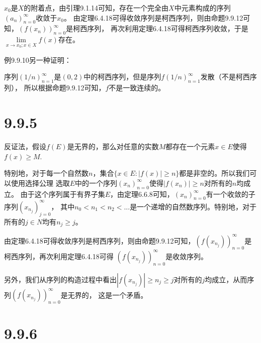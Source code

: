\documentclass{article}
\begin{document}
$x_0$是$X$的附着点，由引理9.1.14可知，存在一个完全由$X$中元素构成的序列$(a_n)_{n=0}^\infty$收敛于$x_0$。
由定理6.4.18可得收敛序列是柯西序列，则由命题9.9.12可知，$(f(x_n))_{n=0}^\infty$是柯西序列，
再次利用定理6.4.18可得柯西序列收敛，于是
$\lim\limits_{x \to x_0; x \in X} f(x)$存在。

例9.9.10另一种证明：

序列$(1/n)_{n=1}^\infty$是$(0,2)$中的柯西序列，但是序列$f(1/n)_{n=1}^\infty$发散（不是柯西序列），
所以根据命题9.9.12可知，$f$不是一致连续的。

\section*{9.9.5}

反证法，假设$f(E)$是无界的，那么对任意的实数$M$都存在一个元素$x \in E$使得$f(x) \geq M$.

特别地，对于每一个自然数$n$，集合$\{x \in E: |f(x)| \geq n\}$都是非空的。所以我们可以使用选择公理
选取$E$中的一个序列$(x_n)_{n=0}^\infty$使得$|f(x_n)| \geq n$对所有的$n$均成立。
由于这个序列属于有界子集$E$，由定理6.6.8可知，$(x_n)_{n=0}^\infty$有一个收敛的子序列$(x_{n_j})_{j=0}^\infty$，
其中$n_0 < n_1 < n_2 < ...$是一个递增的自然数序列。特别地，对于所有的$j \in N$均有$n_j \geq j$。

由定理6.4.18可得收敛序列是柯西序列，则由命题9.9.12可知，$(f(x_{n_j}))_{n=0}^\infty$是柯西序列，再次利用定理6.4.18可得
$(f(x_{n_j}))_{n=0}^\infty$是收敛序列。

另外，我们从序列的构造过程中看出$|f(x_{n_j})| \geq n_j \geq j$对所有的$j$均成立，从而序列$(f(x_{n_j}))_{n=0}^\infty$是无界的，
这是一个矛盾。


\section*{9.9.6}
\end{document}
